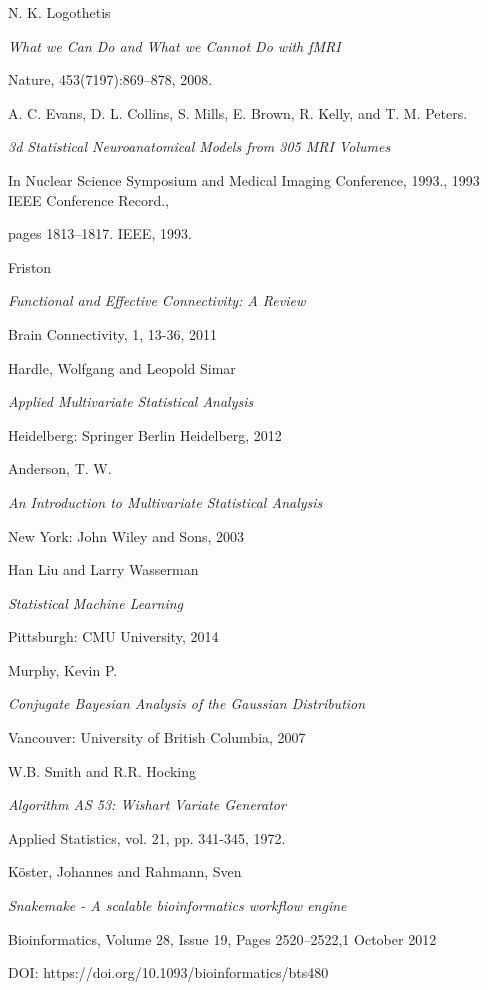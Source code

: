\documentclass[12pt,openright,twoside,a4paper]{book}
\begin{document}
\begin{thebibliography}{99}
N. K. Logothetis

\emph{ What we Can Do and What we Cannot Do with fMRI}

Nature, 453(7197):869–878, 2008.

A. C. Evans, D. L. Collins, S. Mills, E. Brown, R. Kelly, and T. M. Peters.

\emph{3d Statistical Neuroanatomical Models from 305 MRI Volumes}

In Nuclear Science Symposium and Medical Imaging Conference, 1993., 1993 IEEE Conference Record.,

pages 1813–1817. IEEE, 1993.

Friston

\emph{Functional and Effective Connectivity: A Review}

 Brain Connectivity, 1, 13-36, 2011

Hardle, Wolfgang and Leopold Simar

\emph{Applied Multivariate Statistical Analysis}

Heidelberg: Springer Berlin Heidelberg, 2012

Anderson, T. W.

\emph{An Introduction to Multivariate Statistical Analysis}
 
New York: John Wiley and Sons,  2003

 Han Liu and Larry Wasserman
 
 \emph{Statistical Machine Learning}

 Pittsburgh: CMU University, 2014
 
Murphy, Kevin P.

\emph{Conjugate Bayesian Analysis of the Gaussian Distribution}

Vancouver: University of British Columbia, 2007
 
W.B. Smith and R.R. Hocking

\emph{Algorithm AS 53: Wishart Variate Generator}

Applied Statistics, vol. 21, pp. 341-345, 1972.

Köster, Johannes and Rahmann, Sven

\emph{Snakemake - A scalable bioinformatics workflow engine}

Bioinformatics, Volume 28, Issue 19, Pages 2520–2522,1 October 2012

DOI: https://doi.org/10.1093/bioinformatics/bts480


\end{thebibliography}
\end{document}
